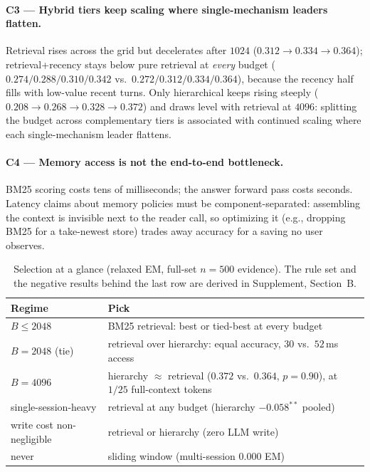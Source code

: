 \documentclass{article} %
\begin{document}
\paragraph{C3 --- Hybrid tiers keep scaling where single-mechanism leaders flatten.}
Retrieval rises across the grid but decelerates after $1024$ ($0.312 \rightarrow 0.334
\rightarrow 0.364$); retrieval+recency stays below pure retrieval at \emph{every} budget
($0.274/0.288/0.310/0.342$ vs.\ $0.272/0.312/0.334/0.364$), because the recency half
fills with low-value recent turns. Only hierarchical keeps rising steeply
($0.208 \rightarrow 0.268 \rightarrow 0.328 \rightarrow 0.372$) and draws level with
retrieval at $4096$: splitting the budget across complementary tiers is associated with
continued scaling where each single-mechanism leader flattens.

\paragraph{C4 --- Memory access is not the end-to-end bottleneck.} BM25 scoring costs tens
of milliseconds; the answer forward pass costs seconds. Latency claims about memory policies
must be component-separated: assembling the context is invisible next to the reader call, so
optimizing it (e.g., dropping BM25 for a take-newest store) trades away accuracy for a saving
no user observes.

\begin{table}[h]
\centering\scriptsize
\caption{Selection at a glance (relaxed EM, full-set $n{=}500$ evidence). The rule set and the
negative results behind the last row are derived in Supplement, Section~B.}
\label{tab:select}
\begin{tabular}{@{}ll@{}}
\toprule
Regime & Pick \\
\midrule
$B\leq2048$ & BM25 retrieval: best or tied-best at every budget \\
$B=2048$ (tie) & retrieval over hierarchy: equal accuracy, $30$ vs.\ $52$\,ms access \\
$B=4096$ & hierarchy $\approx$ retrieval ($0.372$ vs.\ $0.364$, $p{=}0.90$), at $1/25$ full-context tokens \\
single-session-heavy & retrieval at any budget (hierarchy $-0.058^{**}$ pooled) \\
write cost non-negligible & retrieval or hierarchy (zero LLM write) \\
never & sliding window (multi-session $0.000$ EM) \\
\bottomrule
\end{tabular}
\end{table}
\end{document}
